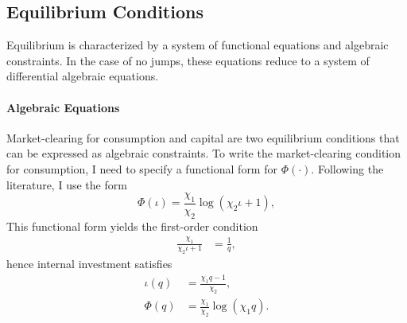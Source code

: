 \documentclass[12 pt, oneside]{article}
\theoremstyle{definition}
\theoremstyle{definition}
\theoremstyle{definition}
\begin{document}
\subsection{Equilibrium Conditions}
Equilibrium is characterized by a system of functional equations and algebraic constraints. In the case of no jumps, these equations reduce to a system of differential algebraic equations.

\paragraph{Algebraic Equations}

Market-clearing for consumption and capital are two equilibrium conditions that can be expressed as algebraic constraints.
To write the market-clearing condition for consumption, I need to specify a functional form for $\Phi(\cdot)$. Following the literature, I use the form
\begin{equation}
  \label{eq:Phi functional form}
\Phi(\iota)  = \frac{\chi_1}{\chi_2} \log(\chi_2\iota + 1),
\end{equation}
This functional form yields the first-order condition
\begin{align*}
  \frac{\chi_1}{\chi_2\iota + 1} & = \frac{1}{q},
\end{align*}
hence internal investment satisfies
\begin{align}
  \label{eq:internal investment as function of q}
\iota(q) & = \frac{\chi_1q - 1}{\chi_2}, \\
\label{eq:Phi as function of q}
\Phi(q) & = \frac{\chi_1}{\chi_2}\log(\chi_1 q).
\end{align}
\end{document}
